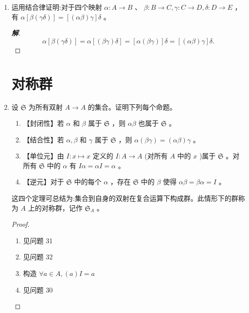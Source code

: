 \documentclass[12pt]{ctexart}
\newenvironment{solution}{\begin{proof}[\indent\bf 解]}{\end{proof}}
\begin{document}
{\begin{enumerate}
由此，两个映射 \(A \rightarrow  D,\left( {\alpha \beta }\right) \gamma\) 与 \(\alpha \left( {\beta \gamma }\right)\) 不可区分。

定理 \(\left( {\alpha \beta }\right) \gamma  = \alpha \left( {\beta \gamma }\right)\) 称为映射复合运算的结合律。

\item  运用结合律证明:对于四个映射 \(\alpha  : A \rightarrow  B\) 、 \(\beta  : B \rightarrow  C,\gamma  : C \rightarrow  D,\delta  : D \rightarrow  E\) ，有 \(\alpha \left\lbrack  {\beta \left( {\gamma \delta }\right) }\right\rbrack   = \left\lbrack  {\left( {\alpha \beta }\right) \gamma }\right\rbrack  \delta\) 。

  \begin{solution}
    
\[
\alpha\left[ \beta \left( \gamma \delta \right) \right] = \alpha\left[ \left( \beta \gamma \right) \delta \right] = \left[ \alpha \left( \beta \gamma \right) \right] \delta=\left[ \left( \alpha \beta \right) \gamma \right] \delta.
\]

  \end{solution}
  
  \section*{对称群}

\item  设 \(\mathfrak{S}\) 为所有双射 \(A \rightarrow  A\) 的集合。证明下列每个命题。
\begin{enumerate}
\item 【封闭性】若 \(\alpha\) 和 \(\beta\) 属于 \(\mathfrak{S}\) ，则 \({\alpha \beta }\) 也属于 \(\mathfrak{S}\) 。

\item 【结合性】若 \(\alpha ,\beta\) 和 \(\gamma\) 属于 \(\mathfrak{S}\) ，则 \(\alpha \left( {\beta \gamma }\right)  = \left( {\alpha \beta }\right) \gamma\) 。

\item  【单位元】由 \(I : x \mapsto  x\) 定义的 \(I : A \rightarrow  A\) (对所有 \(A\) 中的 \(x\) )属于 \(\mathfrak{S}\) 。对所有 \(\mathfrak{S}\) 中的 \(\alpha\) 有 \({I\alpha } = {\alpha I} = \alpha\) 。

\item  【逆元】对于 \(\mathfrak{S}\) 中的每个 \(\alpha\) ，存在 \(\mathfrak{S}\) 中的 \(\beta\) 使得 \({\alpha \beta } = {\beta \alpha } = I\) 。
\end{enumerate}
这四个定理可总结为:集合到自身的双射在复合运算下构成群。此情形下的群称为 \(A\) 上的对称群，记作 \({\mathfrak{S}}_{A}\) 。

\begin{proof}
  \begin{enumerate}
  \item 见问题 31
  \item 见问题 32
  \item 构造 $\forall a \in A, (a)I = a$
  \item 见问题 30
  \end{enumerate}
\end{proof}
\end{enumerate}

}
\end{document}
